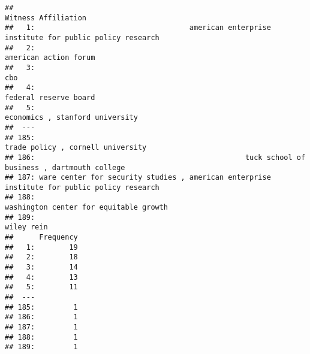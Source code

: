 \documentclass[]{article}
\newenvironment{Shaded}{\begin{snugshade}}{\end{snugshade}}
\newcommand{\KeywordTok}[1]{\textcolor[rgb]{0.13,0.29,0.53}{\textbf{#1}}}
\newcommand{\NormalTok}[1]{#1}
\newcommand{\OperatorTok}[1]{\textcolor[rgb]{0.81,0.36,0.00}{\textbf{#1}}}
\newcommand{\StringTok}[1]{\textcolor[rgb]{0.31,0.60,0.02}{#1}}
\begin{document}
\hypertarget{htmlwidget-6aeceab6ae264b002f71}{}

\begin{Shaded}
\end{Shaded}

\begin{verbatim}
##                                                                              Witness Affiliation
##   1:                                    american enterprise institute for public policy research
##   2:                                                                       american action forum
##   3:                                                                                         cbo
##   4:                                                                       federal reserve board
##   5:                                                             economics , stanford university
##  ---                                                                                            
## 185:                                                           trade policy , cornell university
## 186:                                                 tuck school of business , dartmouth college
## 187: ware center for security studies , american enterprise institute for public policy research
## 188:                                                      washington center for equitable growth
## 189:                                                                                  wiley rein
##      Frequency
##   1:        19
##   2:        18
##   3:        14
##   4:        13
##   5:        11
##  ---          
## 185:         1
## 186:         1
## 187:         1
## 188:         1
## 189:         1
\end{verbatim}
\end{document}
